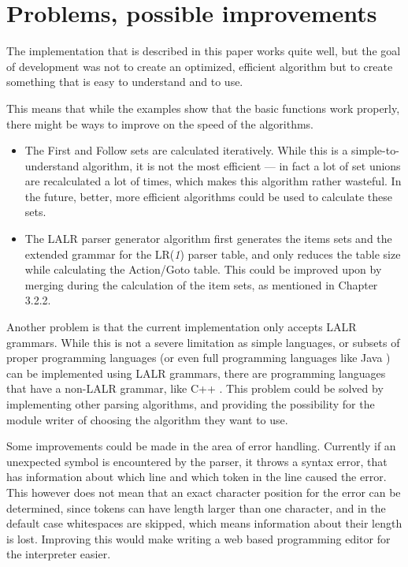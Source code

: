 \chapter{Problems, possible improvements}
The implementation that is described in this paper works quite well, but the goal of development was not to create an optimized, efficient algorithm but to create something that is easy to understand and to use.

This means that while the examples show that the basic functions work properly, there might be ways to improve on the speed of the algorithms.
\begin{itemize}
\item The First and Follow sets are calculated iteratively. While this is a simple-to-understand algorithm, it is not the most efficient --- in fact a lot of set unions are recalculated a lot of times, which makes this algorithm rather wasteful. In the future, better, more efficient algorithms \cite{deremer1982efficient} could be used to calculate these sets.
\item The LALR parser generator algorithm first generates the items sets and the extended grammar for the LR(\textit{1}) parser table, and only reduces the table size while calculating the Action/Goto table. This could be improved upon by merging during the calculation of the item sets, as mentioned in Chapter 3.2.2.
\end{itemize}

Another problem is that the current implementation only accepts LALR grammars. While this is not a severe limitation as simple languages, or subsets of proper programming languages (or even full programming languages like Java \cite{joy2000java}) can be implemented using LALR grammars, there are programming languages that have a non-LALR grammar, like C++ \cite{willink2001meta}. This problem could be solved by implementing other parsing algorithms, and providing the possibility for the module writer of choosing the algorithm they want to use.

Some improvements could be made in the area of error handling. Currently if an unexpected symbol is encountered by the parser, it throws a syntax error, that has information about which line and which token in the line caused the error. This however does not mean that an exact character position for the error can be determined, since tokens can have length larger than one character, and in the default case whitespaces are skipped, which means information about their length is lost. Improving this would make writing a web based programming editor for the interpreter easier.